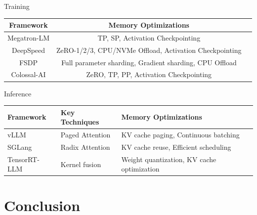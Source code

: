 \documentclass[aspectratio=169]{beamer}
\begin{document}
\begin{frame}{Training}
    \begin{table}[]
    \centering
    \begin{tabular}{ccc}
    \toprule
    \textbf{Framework} &  \textbf{Memory Optimizations}                                      \\ \midrule
    Megatron-LM\cite{shoeybi2020megatronlmtrainingmultibillionparameter}                  & TP, SP, Activation Checkpointing \\ \midrule
    DeepSpeed\cite{deepspeed2020systemoptimizationsenabletrainingdeeplearningmodelswithover100billionparameters}                     & ZeRO-1/2/3, CPU/NVMe Offload, Activation Checkpointing             \\ \midrule
    FSDP\cite{zhao2023pytorchfsdpexperiencesscaling}         & Full parameter sharding, Gradient sharding, CPU Offload            \\ \midrule
    Colossal-AI\cite{colossalai2023aunifieddeeplearningsystemforlargescaleparalleltraining}            & ZeRO, TP, PP, Activation Checkpointing                             \\ \midrule
    \end{tabular}
    \end{table}
\end{frame}


\begin{frame}{Inference}
    \begin{table}[]
    \centering
    \begin{tabular}{lll}
    \toprule
    \textbf{Framework} & \textbf{Key Techniques} & \textbf{Memory Optimizations}              \\ \midrule
    vLLM\cite{kwon2023efficient}               & Paged Attention         & KV cache paging, Continuous batching       \\ \midrule
    SGLang\cite{sglang2024efficientexecutionofstructuredlanguagemodelprograms}             & Radix Attention         & KV cache reuse, Efficient scheduling       \\ \midrule
    TensorRT-LLM\cite{tensorrt-llm2023}       & Kernel fusion           & Weight quantization, KV cache optimization \\ \midrule
    \end{tabular}
    \end{table}
\end{frame}


\section{Conclusion}
\end{document}
